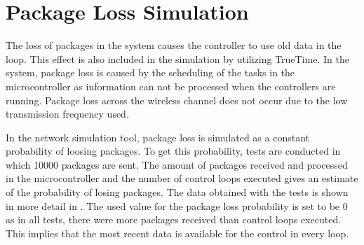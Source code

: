 \section{Package Loss Simulation}
The loss of packages in the system causes the controller to use old data in the loop. This effect is also included in the simulation by utilizing TrueTime. In the system, package loss is caused by the scheduling of the tasks in the microcontroller as information can not be processed when the controllers are running. Package loss across the wireless channel does not occur due to the low transmission frequency used. 

In the network simulation tool, package loss is simulated as a constant probability of loosing packages. To get this probability, tests are conducted in which 10000 packages are sent. The amount of packages received and processed in the microcontroller and the number of control loops executed gives an estimate of the probability of losing packages. The data obtained with the tests is shown in more detail in . The used value for the package loss probability is set to be 0 as in all tests, there were more packages received than control loops executed. This implies that the most recent data is available for the control in every loop. 